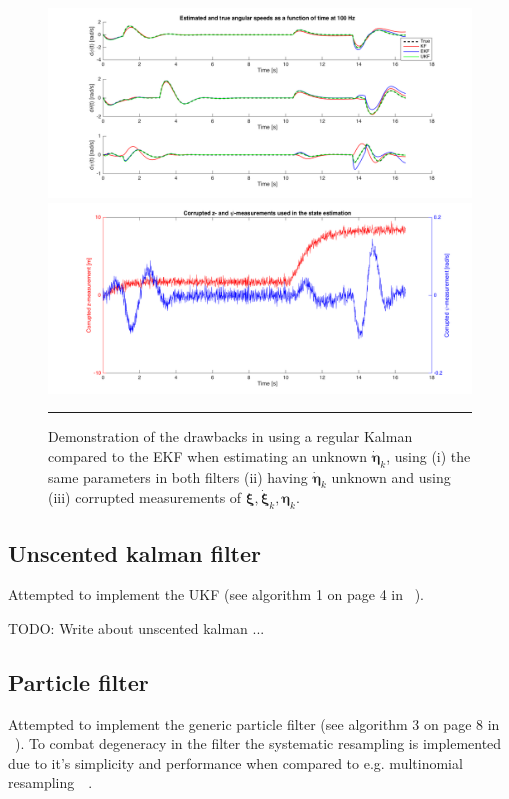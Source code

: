 \documentclass{article}
\begin{document}
\begin{figure}[htbp]
\centering
\includegraphics[width=1\textwidth]{figures/KalmanFilterComparison.png}
\includegraphics[width=1\textwidth]{figures/KalmanCompMeasurements.png}
\rule{35em}{0.5pt}
\caption{Demonstration of the drawbacks in using a regular Kalman compared to the EKF when estimating an unknown $\dot{\boldsymbol\eta}_k$, using (i) the same parameters in both filters (ii) having $\dot{\boldsymbol\eta}_k$ unknown and using (iii) corrupted measurements of $\boldsymbol\xi, \dot{\boldsymbol\xi}_k, \boldsymbol\eta_k$.}
\label{fig:KF-EKF}
\end{figure}

\subsection{Unscented kalman filter}
Attempted to implement the UKF (see algorithm 1 on page 4 in ~\cite{wan2000unscented}).

TODO: Write about unscented kalman ...

\subsection{Particle filter}
Attempted to implement the generic particle filter (see algorithm 3 on page 8 in ~\cite{arulampalam2002tutorial}). To combat degeneracy in the filter the systematic resampling is implemented due to it's simplicity and performance when compared to e.g. multinomial resampling~\cite{douc2005comparison}~\cite{hol2006resampling}.
\end{document}
